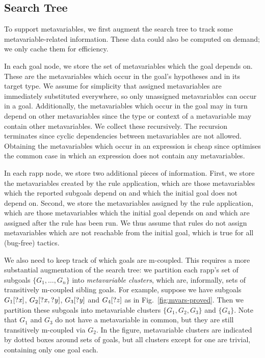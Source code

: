 \subsection{Search Tree}%
\label{sec:mvars-search-tree}

To support metavariables, we first augment the search tree to track some
metavariable-related information. These data could also be computed on demand;
we only cache them for efficiency.

In each goal node, we store the set of metavariables which the goal depends on.
These are the metavariables which occur in the goal's hypotheses and in its
target type. We assume for simplicity that assigned metavariables are
immediately substituted everywhere, so only unassigned metavariables can occur
in a goal. Additionally, the metavariables which occur in the goal may in turn
depend on other metavariables since the type or context of a metavariable may
contain other metavariables. We collect these recursively. The recursion
terminates since cyclic dependencies between metavariables are not allowed.
Obtaining the metavariables which occur in an expression is cheap since \Lean{}
optimises the common case in which an expression does not contain any
metavariables.

In each rapp node, we store two additional pieces of information. First, we
store the metavariables created by the rule application, which are those
metavariables which the reported subgoals depend on and which the initial goal
does not depend on. Second, we store the metavariables assigned by the rule
application, which are those metavariables which the initial goal depends on and
which are assigned after the rule has been run. We thus assume that rules do not
assign metavariables which are not reachable from the initial goal, which is
true for all (bug-free) \Lean{} tactics.

We also need to keep track of which goals are m-coupled. This requires a more
substantial augmentation of the search tree: we partition each rapp's set of
subgoals $\{ G_{1}, \dots, G_{n} \}$ into \emph{metavariable clusters}, which
are, informally, sets of transitively m-coupled sibling goals. For example,
suppose we have subgoals $G_{1}[\mathit{?x}]$, $G_{2}[\mathit{?x}, \mathit{?y}]$,
$G_{3}[\mathit{?y}]$ and $G_{4}[\mathit{?z}]$ as in Fig.~\ref{fig:mvars-proved}. Then we
partition these subgoals into metavariable clusters $\{ G_{1}, G_{2}, G_{3} \}$
and $\{ G_{4} \}$. Note that $G_{1}$ and $G_{3}$ do not have a metavariable in
common, but they are still transitively m-coupled via $G_{2}$. In the figure,
metavariable clusters are indicated by dotted boxes around sets of goals, but
all clusters except for one are trivial, containing only one goal each.

